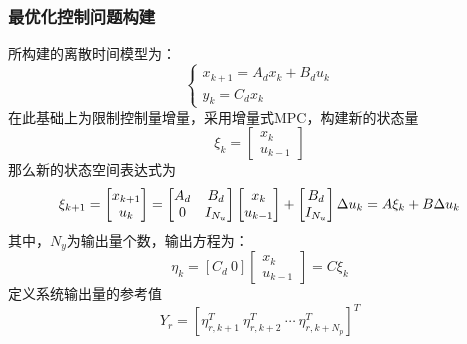        \subsubsection{最优化控制问题构建}
            \label{subsub:opt_prob_construct}
            所构建的离散时间模型为：
            \begin{equation}
            \begin{cases}
            x_{k+1} = A_d x_k + B_d u_k \\
            y_k = C_d x_k
            \end{cases}
            \end{equation}
            在此基础上为限制控制量增量，采用增量式MPC，构建新的状态量\cite{gongjianwei2020mpcbook}
            \begin{equation}
            \xi_k = \begin{bmatrix} x_k \\ u_{k-1} \end{bmatrix}
            \end{equation}
            那么新的状态空间表达式为
            \begin{equation}
            \xi_{k+1} = \begin{bmatrix} x_{k+1} \\ u_k \end{bmatrix} = \begin{bmatrix} A_d & B_d \\ 0 & I_{N_u} \end{bmatrix} \begin{bmatrix} x_k \\ u_{k-1} \end{bmatrix} + \begin{bmatrix} B_d \\ I_{N_u} \end{bmatrix} \Delta u_k \\
            = A \xi_k + B \Delta u_k
            \end{equation}
            \noindent 其中，$N_y$为输出量个数，输出方程为：
            \begin{equation}
            \eta_k = [C_d\ 0] \begin{bmatrix} x_k \\ u_{k-1} \end{bmatrix} = C \xi_k
            \end{equation}
            定义系统输出量的参考值
            \begin{equation}
            Y_r = [\eta_{r,k+1}^T\ \eta_{r,k+2}^T\ \cdots\ \eta_{r,k+N_p}^T]^T
            \end{equation}

